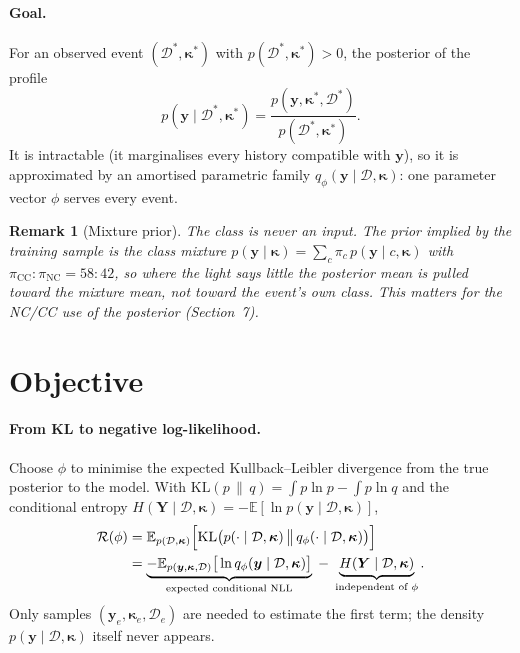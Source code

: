 \documentclass[11pt]{article}
\newtheorem{remark}{Remark}
\theoremstyle{definition}
\newcommand{\D}{\mathcal{D}}
\newcommand{\y}{\bm{y}}
\newcommand{\E}{\mathbb{E}}
\newcommand{\KL}{\mathrm{KL}}
\begin{document}
\paragraph{Goal.}
For an observed event $(\D^\ast,\bm\kappa^\ast)$ with $p(\D^\ast,\bm\kappa^\ast)>0$, the posterior of the profile
\begin{equation}
  p(\y\mid\D^\ast,\bm\kappa^\ast) = \frac{p(\y,\bm\kappa^\ast,\D^\ast)}{p(\D^\ast,\bm\kappa^\ast)} .
  \label{eq:post}
\end{equation}
It is intractable (it marginalises every history compatible with $\y$), so it is approximated by an amortised
parametric family $q_\phi(\y\mid\D,\bm\kappa)$: one parameter vector $\phi$ serves every event.

\begin{remark}[Mixture prior]
The class is never an input. The prior implied by the training sample is the class mixture
$p(\y\mid\bm\kappa) = \sum_c\pi_c\,p(\y\mid c,\bm\kappa)$ with $\pi_{\mathrm{CC}}:\pi_{\mathrm{NC}} = 58:42$, so where
the light says little the posterior mean is pulled toward the mixture mean, not toward the event's own class. This
matters for the NC/CC use of the posterior (Section~7).
\end{remark}

\section{Objective}

\paragraph{From KL to negative log-likelihood.}
Choose $\phi$ to minimise the expected Kullback--Leibler divergence from the true posterior to the model. With
$\KL(p\,\|\,q)=\int p\ln p-\int p\ln q$ and the conditional entropy
$H(\bm Y\mid\D,\bm\kappa) = -\E[\ln p(\y\mid\D,\bm\kappa)]$,
\begin{align}
  \mathcal R(\phi) &= \E_{p(\D,\bm\kappa)}\Big[\KL\big(p(\cdot\mid\D,\bm\kappa)\,\big\|\,q_\phi(\cdot\mid\D,\bm\kappa)\big)\Big] \notag\\
  &= \underbrace{-\E_{p(\y,\bm\kappa,\D)}\big[\ln q_\phi(\y\mid\D,\bm\kappa)\big]}_{\text{expected conditional NLL}}
    \;-\; \underbrace{H(\bm Y\mid\D,\bm\kappa)}_{\text{independent of }\phi}.
  \label{eq:kl}
\end{align}
Only samples $(\y_e,\bm\kappa_e,\D_e)$ are needed to estimate the first term; the density $p(\y\mid\D,\bm\kappa)$
itself never appears.
\end{document}
